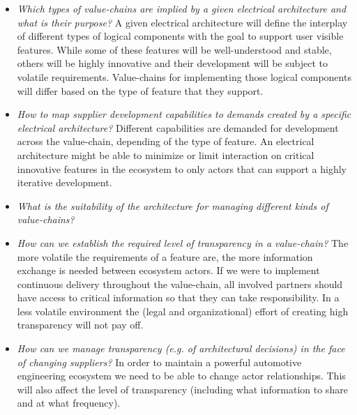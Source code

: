 \begin{itemize}
\item \emph{Which types of value-chains are implied by a given electrical architecture and what is their purpose?} A given electrical architecture will define the interplay of different types of logical components with the goal to support user visible features. 
While some of these features will be well-understood and stable, others will be highly innovative and their development will be subject to volatile requirements. 
Value-chains for implementing those logical components will differ based on the type of feature that they support. 

\item \emph{How to map supplier development capabilities to demands created by a specific electrical architecture?} Different capabilities are demanded for development across the value-chain, depending of the type of feature. 
An electrical architecture might be able to minimize or limit interaction on critical innovative features in the ecosystem to only actors that can support a highly iterative development. 

\item \emph{What is the suitability of the architecture for managing different kinds of value-chains?}

\item \emph{How can we establish the required level of transparency in a value-chain?} The more volatile the requirements of a feature are, the more information exchange is needed between ecosystem actors. 
If we were to implement continuous delivery throughout the value-chain, all involved partners should have access to critical information so that they can take responsibility. 
In a less volatile environment the (legal and organizational) effort of creating high transparency will not pay off. 

\item \emph{How can we manage transparency (e.g. of architectural decisions) in the face of changing suppliers?} In order to maintain a powerful automotive engineering ecosystem we need to be able to change actor relationships. This will also affect the level of transparency (including what information to share and at what frequency).
\end{itemize}

